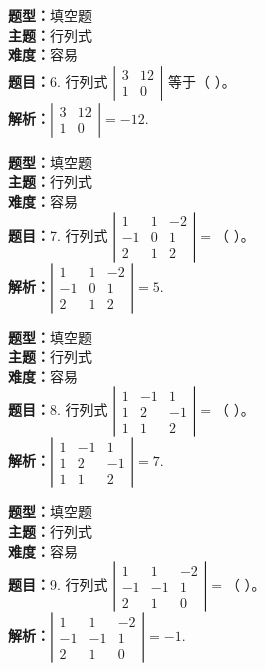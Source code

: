 \documentclass{ctexart}
\newenvironment{question}[5]{%
	\noindent\textbf{题型：}#1\\
	\textbf{主题：}#2\\
	\textbf{难度：}#3\\
	\textbf{题目：}#4\\
	\textbf{解析：}#5\\
	\vspace{1em}
}{}
\begin{document}
\begin{question}
	{填空题}
	{行列式}
	{容易}
	{6. 行列式 $\left|\begin{array}{cc}3 & 12 \\ 1 & 0\end{array}\right|$ 等于（ ）。}
	{$\left|\begin{array}{cc}3 & 12 \\ 1 & 0\end{array}\right|=-12$.}
\end{question}

\begin{question}
	{填空题}
	{行列式}
	{容易}
	{7. 行列式 $\left|\begin{array}{ccc}1 & 1 & -2 \\ -1 & 0 & 1 \\ 2 & 1 & 2\end{array}\right|=$（ ）。}
	{$\left|\begin{array}{ccc}1 & 1 & -2 \\ -1 & 0 & 1 \\ 2 & 1 & 2\end{array}\right|=5$.}
\end{question}

\begin{question}
	{填空题}
	{行列式}
	{容易}
	{8. 行列式 $\left|\begin{array}{ccc}1 & -1 & 1 \\ 1 & 2 & -1 \\ 1 & 1 & 2\end{array}\right|=$（ ）。}
	{$\left|\begin{array}{ccc}1 & -1 & 1 \\ 1 & 2 & -1 \\ 1 & 1 & 2\end{array}\right|=7$.}
\end{question}

\begin{question}
	{填空题}
	{行列式}
	{容易}
	{9. 行列式 $\left|\begin{array}{ccc}1 & 1 & -2 \\ -1 & -1 & 1 \\ 2 & 1 & 0\end{array}\right|=$（ ）。}
	{$\left|\begin{array}{ccc}1 & 1 & -2 \\ -1 & -1 & 1 \\ 2 & 1 & 0\end{array}\right|=-1$.}
\end{question}
\end{document}
